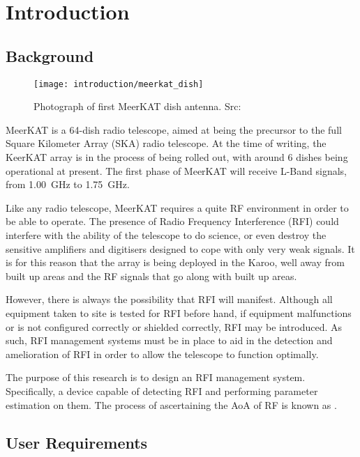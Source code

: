 \chapter{Introduction}
\section{Background}
\begin{wrapfigure}{r}{0.4\textwidth}
  \begin{center}
    \texttt{[image: introduction/meerkat\_dish]}
  \end{center}
  \caption{Photograph of first MeerKAT dish antenna. Src: \cite{skasawebsite}}
\end{wrapfigure}
MeerKAT is a 64-dish radio telescope, aimed at being the precursor to the full Square Kilometer Array (SKA)  radio telescope. At the time of writing, the KeerKAT array is in the process of being rolled out, with around 6 dishes being operational at present.
The first phase of MeerKAT will receive L-Band signals, from \SI{1.00}{\giga\hertz} to \SI{1.75}{\giga\hertz}. 

Like any radio telescope, MeerKAT requires a quite RF environment in order to be able to operate. 
The presence of Radio Frequency Interference (RFI)  could interfere with the ability of the telescope to do science, or even destroy the sensitive amplifiers and digitisers designed to cope with only very weak signals.
It is for this reason that the array is being deployed in the Karoo, well away from built up areas and the RF signals that go along with built up areas. 

However, there is always the possibility that RFI will manifest. 
Although all equipment taken to site is tested for RFI before hand, if equipment malfunctions or is not configured correctly or shielded correctly, RFI may be introduced.
As such, RFI management systems must be in place to aid in the detection and amelioration of RFI in order to allow the telescope to function optimally.

The purpose of this research is to design an RFI management system. 
Specifically, a device capable of detecting RFI and performing  parameter estimation on them. 
The process of ascertaining the AoA of RF is known as .

\section{User Requirements}

